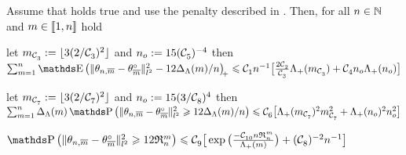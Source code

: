 \begin{lm}\label{ak:re:rest}
Assume that  holds true and use the penalty described in .
Then, for all $n\in{\mathbb N}$ and $m\in{\llbracket 1,n\rrbracket }$ hold
  \begin{resListeN}[]
  \item\label{ak:re:rest:i} let $m_{{\mathcal C}^{}_{3}}:=\lfloor   3(2/{\mathcal C}^{}_{3})^2\rfloor$ and $n_{o}:={15({\mathcal C}^{}_{5})^{-4}}$ then\\ 
    $\sum_{\Di=1}^{\ssY}\E
    \vectp{\Vnormlp{\txdfPr-\xdfPr}^2-12\DipenSv/\ssY}
    \leq \cst{1}\ssY^{-1}\big[\tfrac{2 \cst{2}}{\cst{3}}\miSv[\Di_{\cst{3}}] + \cst{4} n_{o} \miSv[\ssY_{o}]\big]$
  \item\label{ak:re:rest:ii} let
    $m_{{\mathcal C}^{}_{7}}:=\lfloor 3(2 / {\mathcal C}^{}_{7})^2\rfloor$ and
    $n_{o}:=15(3/{\mathcal C}^{}_{8})^4$ then\\
    $\sum_{\Di=1}^{\ssY}\DipenSv\P\big(\Vnormlp{\txdfPr-\xdfPr}^2
    \geq12\DipenSv/\ssY\big)\leq\cst{6}\big[\miSv[\Di_{\cst{7}}]^2\Di_{\cst{7}}^2+\miSv[\ssY_{o}]^2 \ssY_{o}^{2}\big]$
  \item\label{ak:re:rest:iii} 
  $\P\big(\Vnormlp{\txdfPr-\xdfPr}^2 \geq 12\daRaS{\Di}{\xdf,\Lambda}\big)\leq 
    \cst{9} \big[\exp\big(\tfrac{-\cst{10}\ssY\daRaS{\Di}{\xdf,\Lambda}}{\miSv}\big)+(\cst{8})^{-2}\ssY^{-1}\big]$
  \end{resListeN}
\end{lm}


